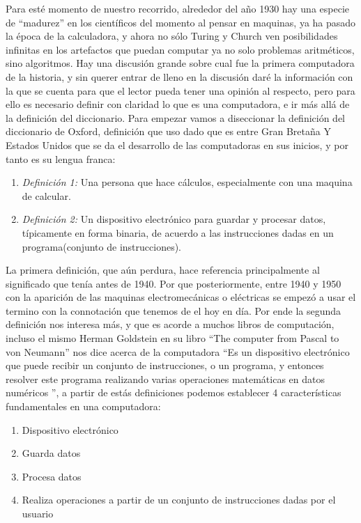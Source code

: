 \documentclass[letterpaper,12pt,oneside]{book}
\begin{document}
		Para esté momento de nuestro recorrido, alrededor del año 1930 hay una especie de ``madurez'' en los científicos del momento al pensar
		en maquinas, ya ha pasado la época de la calculadora, y ahora no sólo Turing y Church ven posibilidades infinitas en los artefactos que puedan
		computar ya no solo problemas aritméticos, sino algoritmos. Hay una discusión grande sobre cual fue la primera computadora de la historia, y sin
		querer entrar de lleno en la discusión daré la información con la que se cuenta para que el lector pueda tener una opinión al respecto, pero
		para ello es necesario definir con claridad lo que es una computadora, e ir más allá de la definición del diccionario. Para empezar vamos a diseccionar la definición 
		del diccionario de Oxford, definición que uso dado que es entre Gran Bretaña Y Estados Unidos que se da el desarrollo de las computadoras
		en sus inicios, y por tanto es su lengua franca:
		\begin{enumerate}
			  \item[] \emph{ Definición 1:} Una persona que hace cálculos, especialmente con una maquina de calcular.
			  \item[] \emph{ Definición 2:} Un dispositivo electrónico para guardar y procesar datos, típicamente en forma binaria, de acuerdo a las instrucciones
			  dadas en un programa(conjunto de instrucciones).
		\end{enumerate}
		
		La primera definición, que aún perdura, hace referencia principalmente al significado que tenía antes de 1940. Por que posteriormente, entre 1940 y 1950
		con la aparición de las maquinas electromecánicas o eléctricas se empezó a usar el termino con la connotación que tenemos de el hoy en día. Por ende
		la segunda definición nos interesa más, y que es acorde a muchos libros de computación, incluso el mismo Herman Goldstein en su libro ``The computer from
		Pascal to von Neumann'' nos dice acerca de la computadora ``Es un dispositivo electrónico que puede recibir un conjunto de instrucciones, o un programa,
		y entonces resolver este programa realizando varias operaciones matemáticas en datos numéricos '', a partir de estás definiciones podemos establecer
		4 características fundamentales en una computadora:
		
		\begin{enumerate}
			\item Dispositivo electrónico 
			\item Guarda datos
			\item Procesa datos
			\item Realiza operaciones a partir de un conjunto de instrucciones dadas por el usuario
		\end{enumerate}
		
\end{document}
